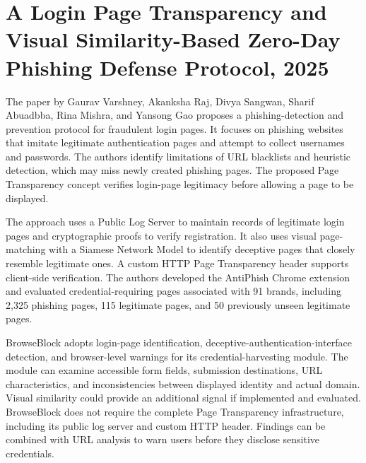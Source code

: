 \clearpage
\section{A Login Page Transparency and Visual Similarity-Based Zero-Day Phishing Defense Protocol, 2025}
The paper by Gaurav Varshney, Akanksha Raj, Divya Sangwan, Sharif Abuadbba,
Rina Mishra, and Yansong Gao proposes a phishing-detection and prevention protocol
for fraudulent login pages. It focuses on phishing websites that imitate
legitimate authentication pages and attempt to collect usernames and passwords.
The authors identify limitations of URL blacklists and heuristic detection,
which may miss newly created phishing pages. The proposed Page Transparency
concept verifies login-page legitimacy before allowing a page to be displayed.

The approach uses a Public Log Server to maintain records of legitimate login
pages and cryptographic proofs to verify registration. It also uses visual
page-matching with a Siamese Network Model to identify deceptive pages that
closely resemble legitimate ones. A custom HTTP Page Transparency header supports
client-side verification. The authors developed the AntiPhish Chrome extension
and evaluated credential-requiring pages associated with 91 brands, including
2,325 phishing pages, 115 legitimate pages, and 50 previously unseen legitimate
pages.

BrowseBlock adopts login-page identification, deceptive-authentication-interface
detection, and browser-level warnings for its credential-harvesting module. The
module can examine accessible form fields, submission destinations, URL
characteristics, and inconsistencies between displayed identity and actual domain.
Visual similarity could provide an additional signal if implemented and evaluated.
BrowseBlock does not require the complete Page Transparency infrastructure,
including its public log server and custom HTTP header. Findings can be combined
with URL analysis to warn users before they disclose sensitive credentials.

